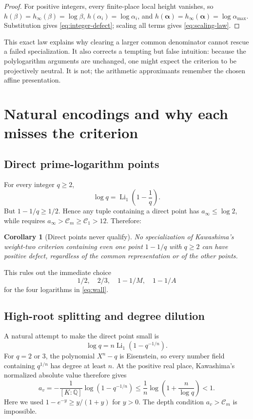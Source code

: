 \documentclass[11pt]{article}
\newtheorem{corollary}[theorem]{Corollary}
\theoremstyle{definition}
\newcommand{\Q}{\mathbb Q}
\newcommand{\Li}{\operatorname{Li}}
\newcommand{\Kc}{\mathcal C}
\begin{document}
\begin{proof}
For positive integers, every finite-place local height vanishes, so
$h(\beta)=h_\infty(\beta)=\log\beta$,
$h(\alpha_i)=\log\alpha_i$, and
$h(\boldsymbol\alpha)=h_\infty(\boldsymbol\alpha)=\log\alpha_{\max}$.
Substitution gives \eqref{eq:integer-defect}; scaling all terms gives
\eqref{eq:scaling-law}.
\end{proof}

This exact law explains why clearing a larger common denominator cannot rescue a failed
specialization.  It also corrects a tempting but false intuition: because the polylogarithm
arguments are unchanged, one might expect the criterion to be projectively neutral.  It is
not; the arithmetic approximants remember the chosen affine presentation.

\section{Natural encodings and why each misses the criterion}

\subsection{Direct prime-logarithm points}

For every integer $q\ge2$,
\begin{equation}\label{eq:direct}
  \log q=\Li_1\!\left(1-\frac1q\right).
\end{equation}
But $1-1/q\ge1/2$.  Hence any tuple containing a direct point has
$a_\infty\le\log2$, while  requires
$a_\infty>\Kc_m\ge\Kc_1>12$.  Therefore:

\begin{corollary}[Direct points never qualify]\label{cor:direct-no}
No specialization of Kawashima's weight-two criterion containing even one point
$1-1/q$ with $q\ge2$ can have positive defect, regardless of the common representation or
of the other points.
\end{corollary}

This rules out the immediate choice
\[
  1/2,\quad 2/3,\quad 1-1/M,\quad 1-1/A
\]
for the four logarithms in \eqref{eq:wall}.

\subsection{High-root splitting and degree dilution}

A natural attempt to make the direct point small is
\begin{equation}\label{eq:root-split}
  \log q=n\Li_1(1-q^{-1/n}).
\end{equation}
For $q=2$ or $3$, the polynomial $X^n-q$ is Eisenstein, so every number field containing
$q^{1/n}$ has degree at least $n$.  At the positive real place, Kawashima's normalized
absolute value therefore gives
\[
 a_v=-\frac1{[K:\Q]}\log(1-q^{-1/n})
 \le \frac1n\log\!\left(1+\frac{n}{\log q}\right)<1.
\]
Here we used $1-e^{-y}\ge y/(1+y)$ for $y>0$.  The depth condition
$a_v>\Kc_m$ is impossible.
\end{document}
